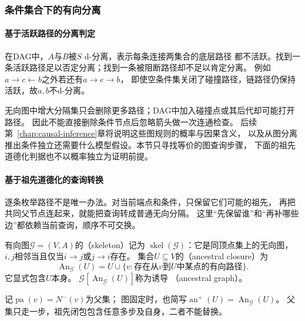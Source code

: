 \subsubsection{条件集合下的有向分离}
\label{sec:graph-theory-conditional-separation}

\paragraph{基于活跃路径的分离判定}

在DAG中，\(A\)与\(B\)被\(S\) d-分离，表示每条连接两集合的底层路径
都不活跃。找到一条活跃路径足以否定分离；找到一条被阻断路径却不足以肯定分离。
例如\(a\to c\leftarrow b\)之外若还有\(a\to e\to b\)，
即使空条件集关闭了碰撞路径，链路径仍保持活跃，故\(a,b\)不d-分离。

无向图中增大分隔集只会删除更多路径；DAG中加入碰撞点或其后代却可能打开路径。
因此不能直接删除条件节点后忽略箭头做一次连通检查。
后续第~\ref{chap:causal-inference}章将说明这些图规则的概率与因果含义，
以及从图分离推出条件独立还需要什么模型假设。本节只寻找等价的图查询步骤，
下面的祖先道德化判据也不以概率独立为证明前提。

\paragraph{基于祖先道德化的查询转换}
\label{sec:graph-theory-directed-transformations}

逐条枚举路径不是唯一办法。对当前端点和条件，只保留它们可能的祖先，
再把共同父节点连起来，就能把查询转成普通无向分隔。
这里“先保留谁”和“再补哪些边”都依赖当前查询，顺序不可交换。

\begin{definition}[骨架、祖先闭包与诱导祖先图]
  \label{def:graph-theory-directed-structure}
  有向图\(\mathcal G=(V,A)\)的（skeleton）记为
  \(\operatorname{skel}(\mathcal G)\)：它是同顶点集上的无向图，
  \(i,j\)相邻当且仅当\(i\to j\)或\(j\to i\)存在。
  集合\(U\subseteq V\)的（ancestral closure）为
  \[
    \operatorname{An}_{\mathcal G}(U)
    =U\cup\{v:\text{存在从\(v\)到\(U\)中某点的有向路径}\}.
  \]
  它显式包含\(U\)本身。
  \(\mathcal G[\operatorname{An}_{\mathcal G}(U)]\)称为诱导
  （ancestral graph）。
\end{definition}

记\(\operatorname{pa}(v)=N^-(v)\)为父集；
图固定时，也简写\(\operatorname{an}^{+}(U)=\operatorname{An}_{\mathcal G}(U)\)。
父集只走一步，祖先闭包包含任意多步及自身，二者不能替换。

